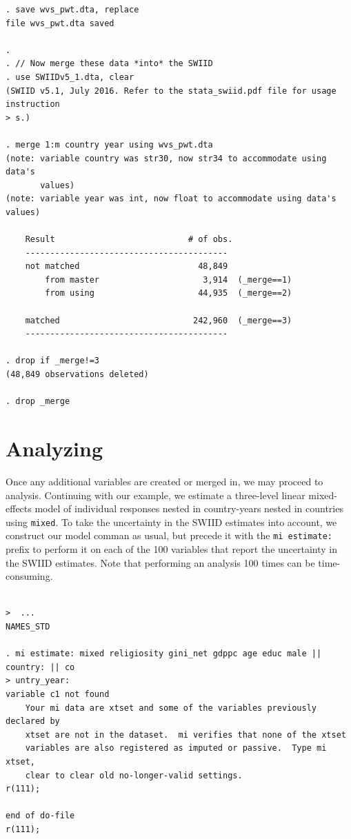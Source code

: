 \documentclass[11pt,]{article}
\theoremstyle{definition}
\theoremstyle{definition}
\theoremstyle{remark}
\begin{document}
\begin{verbatim}
. save wvs_pwt.dta, replace
file wvs_pwt.dta saved

. 
. // Now merge these data *into* the SWIID
. use SWIIDv5_1.dta, clear
(SWIID v5.1, July 2016. Refer to the stata_swiid.pdf file for usage instruction
> s.)

. merge 1:m country year using wvs_pwt.dta
(note: variable country was str30, now str34 to accommodate using data's
       values)
(note: variable year was int, now float to accommodate using data's values)

    Result                           # of obs.
    -----------------------------------------
    not matched                        48,849
        from master                     3,914  (_merge==1)
        from using                     44,935  (_merge==2)

    matched                           242,960  (_merge==3)
    -----------------------------------------

. drop if _merge!=3
(48,849 observations deleted)

. drop _merge
\end{verbatim}

\section{Analyzing}\label{analyzing}

Once any additional variables are created or merged in, we may proceed
to analysis. Continuing with our example, we estimate a three-level
linear mixed-effects model of individual responses nested in
country-years nested in countries using \texttt{mixed}. To take the
uncertainty in the SWIID estimates into account, we construct our model
comman as usual, but precede it with the \texttt{mi\ estimate:} prefix
to perform it on each of the 100 variables that report the uncertainty
in the SWIID estimates. Note that performing an analysis 100 times can
be time-consuming.

\begin{verbatim}

>  ...
NAMES_STD

. mi estimate: mixed religiosity gini_net gdppc age educ male || country: || co
> untry_year:
variable c1 not found
    Your mi data are xtset and some of the variables previously declared by
    xtset are not in the dataset.  mi verifies that none of the xtset
    variables are also registered as imputed or passive.  Type mi xtset,
    clear to clear old no-longer-valid settings.
r(111);

end of do-file
r(111);
\end{verbatim}
\end{document}
